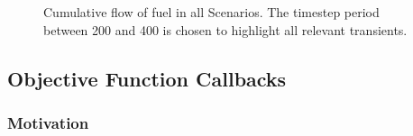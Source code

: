 \begin{figure}
  \centering
  \begin{minipage}{\textwidth}
    \centering
  \end{minipage}%
  \caption[]{
    \label{fig:flows}
    Cumulative flow of fuel in all Scenarios. The timestep period between 200
    and 400 is chosen to highlight all relevant transients. }
\end{figure}



\subsection{Objective Function Callbacks}\label{subsection:callback}

\subsubsection{Motivation}

